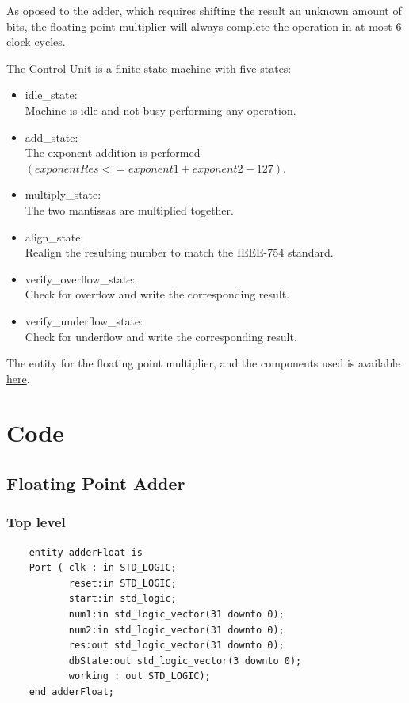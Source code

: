 \documentclass[a4paper,10pt]{article}
\begin{document}
    As oposed to the adder, which requires shifting the result an unknown amount of bits, the floating point multiplier will always complete the operation in at most 6 clock cycles.

    The Control Unit is a finite state machine with five states:
    \begin{itemize}
      \item idle\_state:\\
      Machine is idle and not busy performing any operation.
      \item add\_state:\\
      The exponent addition is performed\\
      $(exponentRes <= exponent1 + exponent2 - 127)$.
      \item multiply\_state:\\
      The two mantissas are multiplied together.
      \item align\_state:\\
      Realign the resulting number to match the IEEE-754 standard.
      \item verify\_overflow\_state:\\
      Check for overflow and write the corresponding result.
      \item verify\_underflow\_state:\\
      Check for underflow and write the corresponding result.
    \end{itemize}

    The entity for the floating point multiplier, and the components used is available \hyperref[sec:multiplier]{here}.


    \newpage
    \section{Code}
    \subsection{Floating Point Adder}
    \label{sec:adder}
    \subsubsection{Top level}
    \begin{lstlisting}
    entity adderFloat is
    Port ( clk : in STD_LOGIC;
           reset:in STD_LOGIC;
           start:in std_logic;
           num1:in std_logic_vector(31 downto 0);
           num2:in std_logic_vector(31 downto 0);
           res:out std_logic_vector(31 downto 0);
           dbState:out std_logic_vector(3 downto 0);
           working : out STD_LOGIC);
    end adderFloat;
    \end{lstlisting}
\end{document}
